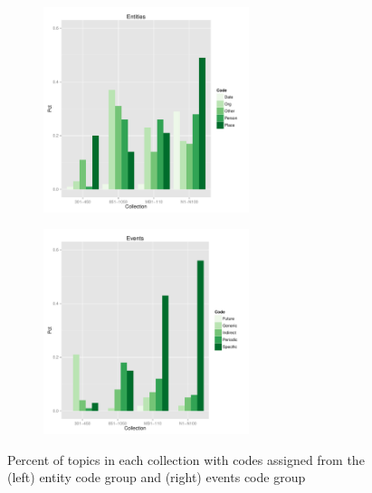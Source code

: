\documentclass[runningheads,a4paper]{llncs}
\begin{document}
\begin{figure}
\centering
\begin{subfigure}{.5\textwidth}
  \centering
\includegraphics[width=6cm]{plots/topic-groups-ent.pdf}
\end{subfigure}%
\begin{subfigure}{.5\textwidth}
  \centering
\includegraphics[width=6cm]{plots/topic-groups-evt.pdf}
\end{subfigure}
\caption{Percent of topics in each collection with codes assigned from the (left) entity code group and (right) events code group}
\label{fig.codedist}
\end{figure}

\end{document}
